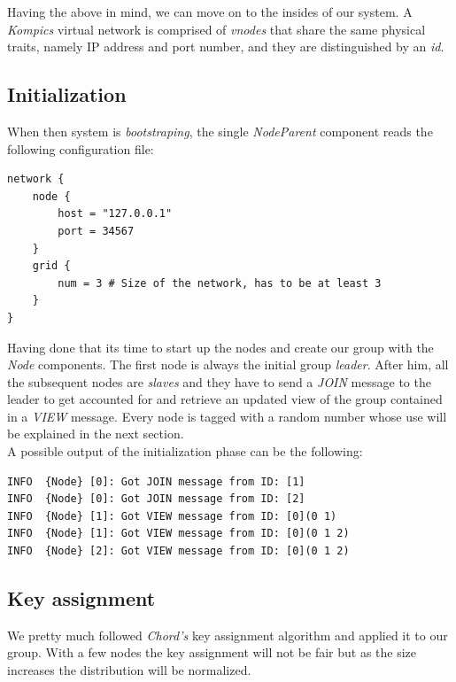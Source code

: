 \documentclass[a4paper, 11pt]{article}
\begin{document}
\noindent Having the above in mind, we can move on to the insides of our system. A \textit{Kompics} virtual network is comprised of \textit{vnodes} that share the same physical traits, namely IP address and port number, and they are distinguished by an \textit{id}. \\

\subsection{Initialization}

\noindent When then system is \textit{bootstraping}, the single \textit{NodeParent} component reads the following configuration file: 

\begin{verbatim}
network {
    node {
        host = "127.0.0.1"
        port = 34567
    }
    grid {
        num = 3 # Size of the network, has to be at least 3
    }
}
\end{verbatim}

\noindent Having done that its time to start up the nodes and create our group with the \textit{Node} components. The first node is always the initial group \textit{leader}. After him, all the subsequent nodes are \textit{slaves} and they have to send a \textit{JOIN} message to the leader to get accounted for and retrieve an updated view of the group contained in a \textit{VIEW} message. Every node is tagged with a random number whose use will be explained in the next section. \\

\noindent A possible output of the initialization phase can be the following:

\begin{verbatim}
INFO  {Node} [0]: Got JOIN message from ID: [1]
INFO  {Node} [0]: Got JOIN message from ID: [2]
INFO  {Node} [1]: Got VIEW message from ID: [0](0 1)
INFO  {Node} [1]: Got VIEW message from ID: [0](0 1 2)
INFO  {Node} [2]: Got VIEW message from ID: [0](0 1 2)
\end{verbatim}

\subsection{Key assignment} \label{keys}

\noindent We pretty much followed \textit{Chord's} key assignment algorithm and applied it to our group. With a few nodes the key assignment will not be fair but as the size increases the distribution will be normalized.
\end{document}
